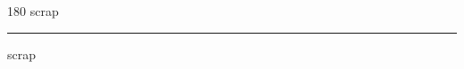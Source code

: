 
\begin{frame}
\begin{center}
\begin{turn}{180}
{\fontsize{2.5cm}{1em}\selectfont scrap}
\end{turn}
\vspace{1em}\par  
\hrule
\vspace{1em}\par  
{\fontsize{2.5cm}{1em}\selectfont scrap}
\end{center}
\end{frame}

